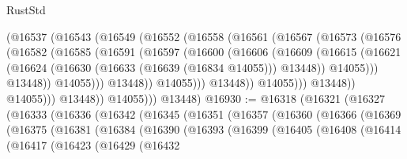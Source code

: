 \begin{lexlean}{RustStd}
\begin{coremodule}
                          (@16537
                            (@16543
                              (@16549
                                (@16552
                                  (@16558
                                    (@16561
                                      (@16567
                                        (@16573
                                          (@16576
                                            (@16582
                                              (@16585
                                                (@16591
                                                  (@16597
                                                    (@16600
                                                      (@16606
                                                        (@16609
                                                          (@16615
                                                            (@16621
                                                              (@16624
                                                                (@16630
                                                                  (@16633 (@16639 (@16834 @14055)))
                                                                  @13448))
                                                              @14055)))
                                                        @13448))
                                                    @14055)))
                                              @13448))
                                          @14055)))
                                    @13448))
                                @14055)))
                          @13448))
                      @14055)))
                @13448))
            @14055)))
      @13448)
@16930 := @16318
    (@16321
      (@16327
        (@16333
          (@16336
            (@16342
              (@16345
                (@16351
                  (@16357
                    (@16360
                      (@16366
                        (@16369
                          (@16375
                            (@16381
                              (@16384
                                (@16390
                                  (@16393
                                    (@16399
                                      (@16405
                                        (@16408
                                          (@16414
                                            (@16417
                                              (@16423
                                                (@16429
                                                  (@16432

\end{coremodule}
\end{lexlean}
